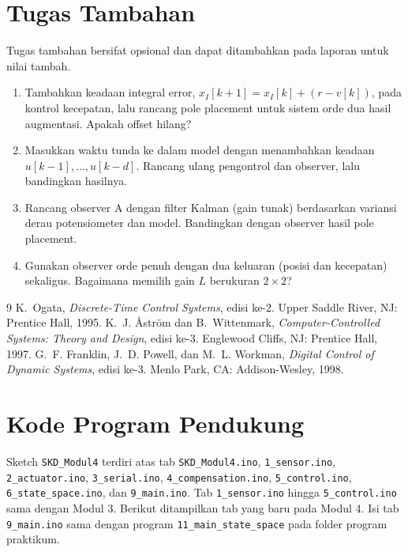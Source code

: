 \documentclass[11pt,a4paper]{article}
\newcommand{\prog}[1]{\texttt{#1}}
\begin{document}
\section{Tugas Tambahan}
Tugas tambahan bersifat opsional dan dapat ditambahkan pada laporan untuk nilai tambah.
\begin{enumerate}
\item Tambahkan keadaan integral error, $x_I[k+1] = x_I[k] + (r - v[k])$, pada kontrol kecepatan, lalu rancang pole placement untuk sistem orde dua hasil augmentasi. Apakah offset hilang?
\item Masukkan waktu tunda ke dalam model dengan menambahkan keadaan $u[k-1], \ldots, u[k-d]$. Rancang ulang pengontrol dan observer, lalu bandingkan hasilnya.
\item Rancang observer A dengan filter Kalman (gain tunak) berdasarkan variansi derau potensiometer dan model. Bandingkan dengan observer hasil pole placement.
\item Gunakan observer orde penuh dengan dua keluaran (posisi dan kecepatan) sekaligus. Bagaimana memilih gain $L$ berukuran $2 \times 2$?
\end{enumerate}

\begin{thebibliography}{9}
 K.~Ogata, \textit{Discrete-Time Control Systems}, edisi ke-2. Upper Saddle River, NJ: Prentice Hall, 1995.
 K.~J. Åström dan B.~Wittenmark, \textit{Computer-Controlled Systems: Theory and Design}, edisi ke-3. Englewood Cliffs, NJ: Prentice Hall, 1997.
 G.~F. Franklin, J.~D. Powell, dan M.~L. Workman, \textit{Digital Control of Dynamic Systems}, edisi ke-3. Menlo Park, CA: Addison-Wesley, 1998.
\end{thebibliography}

\clearpage
\appendix
\section{Kode Program Pendukung}
\label{lamp:kode}
Sketch \prog{SKD\_Modul4} terdiri atas tab \prog{SKD\_Modul4.ino}, \prog{1\_sensor.ino}, \prog{2\_actuator.ino}, \prog{3\_serial.ino}, \prog{4\_compensation.ino}, \prog{5\_control.ino}, \prog{6\_state\_space.ino}, dan \prog{9\_main.ino}. Tab \prog{1\_sensor.ino} hingga \prog{5\_control.ino} sama dengan Modul 3. Berikut ditampilkan tab yang baru pada Modul 4. Isi tab \prog{9\_main.ino} sama dengan program \prog{11\_main\_state\_space} pada folder program praktikum.
\end{document}
